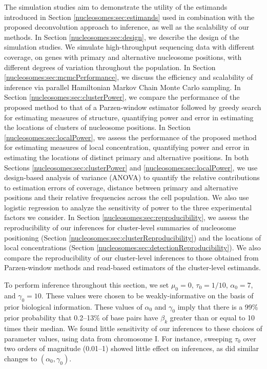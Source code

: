 The simulation studies aim to demonstrate the utility of the estimands introduced in Section \ref{nucleosomes:sec:estimands} used in combination with the proposed deconvolution approach to inference, as well as the scalability of our methods.
In Section \ref{nucleosomes:sec:design}, we describe the design of the simulation studies. 
We simulate high-throughput sequencing data with different coverage, on genes with primary and alternative nucleosome positions, with different degrees of variation throughout the population. 
In Section \ref{nucleosomes:sec:mcmcPerformance}, we discuss the efficiency and scalability of inference via parallel Hamiltonian Markov Chain Monte Carlo sampling.
In Section \ref{nucleosomes:sec:clusterPower}, we compare the performance of the proposed method to that of a Parzen-window estimator followed by greedy search \citep[the standard in the field;][]{Albert2007,Shivaswamy2008,Tsankov2010,Tirosh2012} for estimating measures of structure, quantifying power and error in estimating the locations of clusters of nucleosome positions.
In Section \ref{nucleosomes:sec:localPower}, we assess the performance of the proposed method for estimating measures of local concentration, quantifying power and error in estimating the locations of distinct primary and alternative positions.
%
In both Sections \ref{nucleosomes:sec:clusterPower} and \ref{nucleosomes:sec:localPower}, we use design-based analysis of variance (ANOVA) to quantify the relative contributions to estimation errors of coverage, distance between primary and alternative positions and their relative frequencies across the cell population.
We also use logistic regression to analyze the sensitivity of power to the three experimental factors we consider.
%
In Section \ref{nucleosomes:sec:reproducibility}, we assess the reproducibility of our inferences for cluster-level summaries of nucleosome positioning (Section \ref{nucleosomes:sec:clusterReproducibility}) and the locations of local concentrations (Section \ref{nucleosomes:sec:detectionReproducibility}).
We also compare the reproducibility of our cluster-level inferences to those obtained from Parzen-window methods and read-based estimators of the cluster-level estimands.

To perform inference throughout this section, we set $\mu_0 = 0$, $\tau_0 = 1/10$, $\alpha_0 = 7$, and $\gamma_0 = 10$.
These values were chosen to be weakly-informative on the basis of prior biological information.
These values of $\alpha_0$ and $\gamma_0$ imply that there is a 99\% prior probability that 0.2--13\% of base pairs have $\beta_k$ greater than or equal to 10 times their median.
%
We found little sensitivity of our inferences to these choices of parameter values, using data from chromosome I.
For instance, sweeping $\tau_0$ over two orders of magnitude (0.01--1) showed little effect on inferences, as did similar changes to $(\alpha_0, \gamma_0)$.

